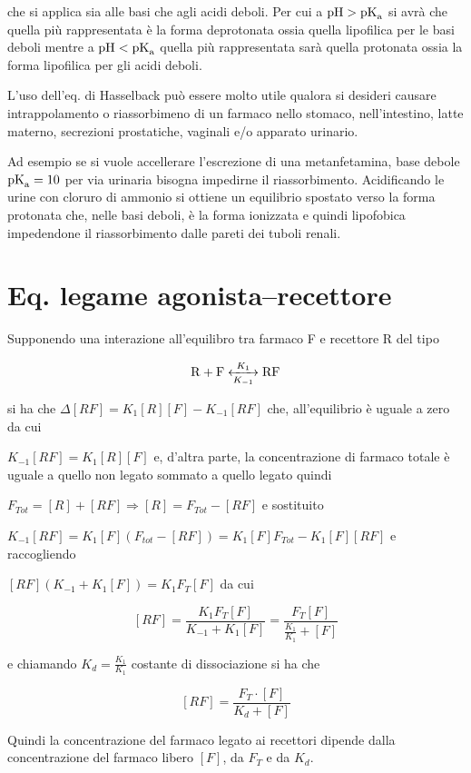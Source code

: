 che si applica sia alle basi che agli acidi deboli. Per cui a $\ce{pH} > \ce{pK_a}$ si avrà che quella più rappresentata è la forma deprotonata ossia quella lipofilica per le basi deboli mentre a $\ce{pH} < \ce{pK_a}$ quella più rappresentata sarà quella protonata ossia la forma lipofilica per gli acidi deboli.

L'uso dell'eq. di Hasselback può essere molto utile qualora si desideri causare intrappolamento o riassorbimeno di un farmaco nello stomaco, nell'intestino, latte materno, secrezioni prostatiche, vaginali e/o apparato urinario.

Ad esempio se si vuole accellerare l'escrezione di una metanfetamina, base debole $\ce{pK_a} = 10$ per via urinaria bisogna impedirne il riassorbimento. Acidificando le urine con cloruro di ammonio si ottiene un equilibrio spostato verso la forma protonata che, nelle basi deboli, è la forma ionizzata e quindi lipofobica impedendone il riassorbimento dalle pareti dei tuboli renali.

\section{Eq. legame agonista--recettore}

Supponendo una interazione all'equilibro tra farmaco F e recettore R del tipo

$$ \ce{R + F <->[K_1][K_{-1}] RF} $$

si ha che $\Delta[RF] = K_1[R][F] - K_{-1}[RF]$ che, all'equilibrio è uguale a zero da cui

$K_{-1}[RF] = K_1[R][F]$ e, d'altra parte, la concentrazione di farmaco totale è uguale a quello non legato sommato a quello legato quindi

$F_{Tot} = [R] + [RF] \Rightarrow [R] = F_{Tot} - [RF]$ e sostituito

$K_{-1}[RF] = K_1[F](F_{tot} - [RF]) = K_1[F]F_{Tot} - K_1[F][RF]$ e raccogliendo

$[RF](K_{-1} + K_1[F]) = K_1F_T[F]$ da cui

$$[RF] = \frac{K_1F_T[F]}{K_{-1}+K_1[F]}=\frac{F_T[F]}{\frac{K_1}{K_1} + [F]}$$

e chiamando $K_d = \frac{K_1}{K_1}$ costante di dissociazione si ha che

$$[RF]=\frac{F_T\cdot[F]}{K_d+[F]}$$

Quindi la concentrazione del farmaco legato ai recettori dipende dalla concentrazione del farmaco libero $[F]$, da $F_T$ e da $K_d$.

